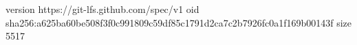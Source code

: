 version https://git-lfs.github.com/spec/v1
oid sha256:a625ba60be508f3f0c991809c59df85c1791d2ca7c2b7926fc0a1f169b00143f
size 5517

